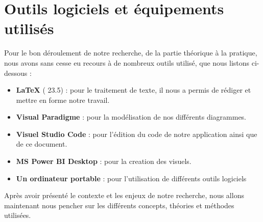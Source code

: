     \section[Outils logiciels et équipements utilisés]{Outils logiciels et équipements utilisés}
    Pour le bon déroulement de notre recherche, de la partie
    théorique à la pratique, nous avons sans cesse eu recours
    à de nombreux outils utilisé, que nous listons ci-dessous :
    \par
        \begin{itemize}
            \setlength{\itemsep}{0pt}
            \item [\ding{226}] \textbf{\LaTeX} ( 23.5) : pour le traitement de texte, il nous a permis de
            rédiger et mettre en forme notre travail.
            \item [\ding{226}] \textbf{Visual Paradigme} : pour la modélisation de nos
            différents diagrammes.
            \item [\ding{226}] \textbf{Visuel Studio Code} : pour l’édition du code de notre application ainsi que de ce document.
            \item [\ding{226}] \textbf{MS Power BI Desktop} : pour la creation des visuels.
            \item [\ding{226}] \textbf{Un ordinateur portable} : pour l’utilisation de différents outils
            logiciels
        \end{itemize}
    Après avoir présenté le contexte et les enjeux de notre recherche, nous allons maintenant nous pencher sur
    les différents concepts, théories et méthodes utilisées.